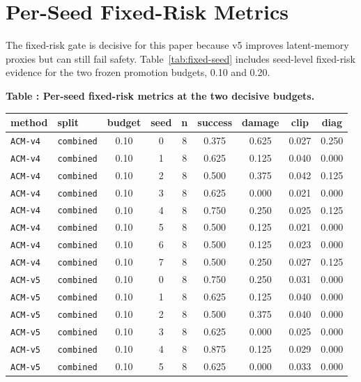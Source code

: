 \documentclass{article}
\begin{document}
\section{Per-Seed Fixed-Risk Metrics}
The fixed-risk gate is decisive for this paper because v5 improves latent-memory proxies but can still fail safety. Table~\ref{tab:fixed-seed} includes seed-level fixed-risk evidence for the two frozen promotion budgets, 0.10 and 0.20.

\tiny
\setlength{\tabcolsep}{2pt}
\begin{center}
\label{tab:fixed-seed}\textbf{Table \thetable: Per-seed fixed-risk metrics at the two decisive budgets.}\\[0.4ex]
\begin{tabular}{llccccccc}
\toprule
method & split & budget & seed & n & success & damage & clip & diag \\
\midrule
\texttt{ACM-v4} & \texttt{combined} & 0.10 & 0 & 8 & 0.375 & 0.625 & 0.027 & 0.250 \\
\texttt{ACM-v4} & \texttt{combined} & 0.10 & 1 & 8 & 0.625 & 0.125 & 0.040 & 0.000 \\
\texttt{ACM-v4} & \texttt{combined} & 0.10 & 2 & 8 & 0.500 & 0.375 & 0.042 & 0.125 \\
\texttt{ACM-v4} & \texttt{combined} & 0.10 & 3 & 8 & 0.625 & 0.000 & 0.021 & 0.000 \\
\texttt{ACM-v4} & \texttt{combined} & 0.10 & 4 & 8 & 0.750 & 0.250 & 0.025 & 0.125 \\
\texttt{ACM-v4} & \texttt{combined} & 0.10 & 5 & 8 & 0.500 & 0.125 & 0.021 & 0.000 \\
\texttt{ACM-v4} & \texttt{combined} & 0.10 & 6 & 8 & 0.500 & 0.125 & 0.023 & 0.000 \\
\texttt{ACM-v4} & \texttt{combined} & 0.10 & 7 & 8 & 0.500 & 0.250 & 0.027 & 0.125 \\
\texttt{ACM-v5} & \texttt{combined} & 0.10 & 0 & 8 & 0.750 & 0.250 & 0.031 & 0.000 \\
\texttt{ACM-v5} & \texttt{combined} & 0.10 & 1 & 8 & 0.625 & 0.125 & 0.040 & 0.000 \\
\texttt{ACM-v5} & \texttt{combined} & 0.10 & 2 & 8 & 0.500 & 0.375 & 0.040 & 0.000 \\
\texttt{ACM-v5} & \texttt{combined} & 0.10 & 3 & 8 & 0.625 & 0.000 & 0.025 & 0.000 \\
\texttt{ACM-v5} & \texttt{combined} & 0.10 & 4 & 8 & 0.875 & 0.125 & 0.029 & 0.000 \\
\texttt{ACM-v5} & \texttt{combined} & 0.10 & 5 & 8 & 0.625 & 0.000 & 0.033 & 0.000 \\

\end{tabular}
\end{center}
\end{document}
